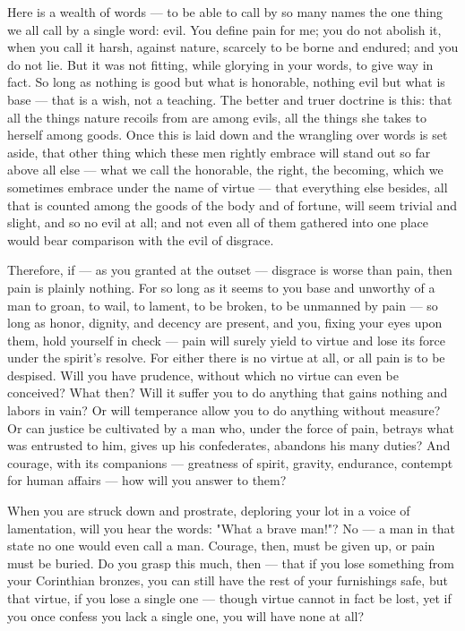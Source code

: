  Here is a wealth of words — to be able to call by so many names the one thing we all call by a single word: evil. You define pain for me; you do not abolish it, when you call it harsh, against nature, scarcely to be borne and endured; and you do not lie. But it was not fitting, while glorying in your words, to give way in fact. So long as nothing is good but what is honorable, nothing evil but what is base — that is a wish, not a teaching. The better and truer doctrine is this: that all the things nature recoils from are among evils, all the things she takes to herself among goods. Once this is laid down and the wrangling over words is set aside, that other thing which these men rightly embrace will stand out so far above all else — what we call the honorable, the right, the becoming, which we sometimes embrace under the name of virtue — that everything else besides, all that is counted among the goods of the body and of fortune, will seem trivial and slight, and so no evil at all; and not even all of them gathered into one place would bear comparison with the evil of disgrace.

 Therefore, if — as you granted at the outset — disgrace is worse than pain, then pain is plainly nothing. For so long as it seems to you base and unworthy of a man to groan, to wail, to lament, to be broken, to be unmanned by pain — so long as honor, dignity, and decency are present, and you, fixing your eyes upon them, hold yourself in check — pain will surely yield to virtue and lose its force under the spirit's resolve. For either there is no virtue at all, or all pain is to be despised. Will you have prudence, without which no virtue can even be conceived? What then? Will it suffer you to do anything that gains nothing and labors in vain? Or will temperance allow you to do anything without measure? Or can justice be cultivated by a man who, under the force of pain, betrays what was entrusted to him, gives up his confederates, abandons his many duties? And courage, with its companions — greatness of spirit, gravity, endurance, contempt for human affairs — how will you answer to them?

 When you are struck down and prostrate, deploring your lot in a voice of lamentation, will you hear the words: "What a brave man!"? No — a man in that state no one would even call a man. Courage, then, must be given up, or pain must be buried. Do you grasp this much, then — that if you lose something from your Corinthian bronzes, you can still have the rest of your furnishings safe, but that virtue, if you lose a single one — though virtue cannot in fact be lost, yet if you once confess you lack a single one, you will have none at all?

